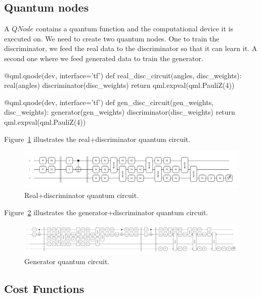 \subsection{Quantum nodes}
\label{sec:qnode}

A $QNode$ contains a quantum function and the computational device it is 
executed on. We need to create two quantum nodes. One to train the discriminator,
we feed the real data to the discriminator so that it can learn it. A second one
where we feed generated data to train the generator.
\begin{python}
@qml.qnode(dev, interface='tf')
def real_disc_circuit(angles, disc_weights):
    real(angles)
    discriminator(disc_weights)
    return qml.expval(qml.PauliZ(4))

@qml.qnode(dev, interface='tf')
def gen_disc_circuit(gen_weights, disc_weights):
    generator(gen_weights)
    discriminator(disc_weights)
    return qml.expval(qml.PauliZ(4)) 
\end{python}

Figure~\ref{fig:real_disc_cirq} illustrates the real+discriminator quantum 
circuit.

\begin{figure}[!htbp]
\centering
    \includegraphics[width=1\textwidth]{figures/real_disc_cirq.pdf}
\caption{Real+discriminator quantum circuit.}
\label{fig:real_disc_cirq}
\end{figure}

Figure~\ref{fig:gen_disc_cirq} illustrates the generator+discriminator quantum 
circuit.

\begin{figure}[!htbp]
\centering
    \includegraphics[width=1\textwidth]{figures/gen_disc_cirq.pdf}
\caption{Generator quantum circuit.}
\label{fig:gen_disc_cirq}
\end{figure}

\subsection{Cost Functions}
\label{sec:cost}

